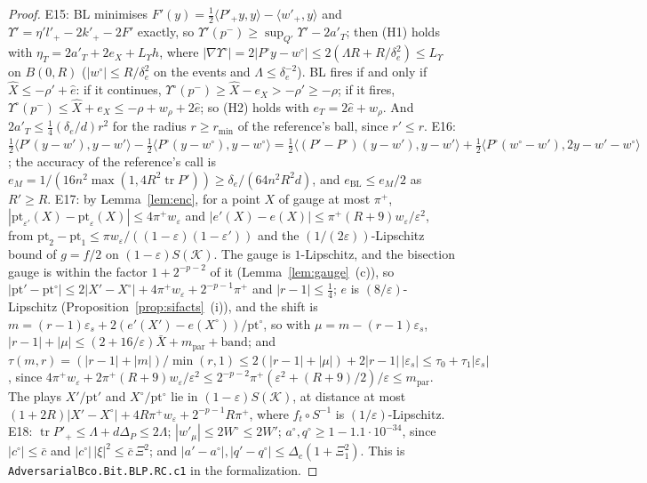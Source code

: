\documentclass[11pt]{amsart}
\theoremstyle{definition}
\numberwithin{equation}{section}
\newcommand{\cK}{\mathcal{K}}
\newcommand{\tr}{\operatorname{tr}}
\newcommand{\ip}[1]{\langle #1\rangle}
\begin{document}
\begin{proof}
E15: BL minimises $F'(y)=\frac12\ip{P'_+y,y}-\ip{w'_+,y}$ and $\Upsilon'=\eta'l'_+-2k'_+-2F'$ exactly, so $\Upsilon'(p^-)\ge\sup_{Q'}\Upsilon'-2a'_T$; then (H1) holds with $\eta_T=2a'_T+2e_X+L_\Upsilon h$, where $|\nabla\Upsilon^\circ|=2|P^\circ y-w^\circ|\le2(\Lambda R+R/\delta_e^2)\le L_\Upsilon$ on $B(0,R)$ ($|w^\circ|\le R/\delta_e^2$ on the events and $\Lambda\le\delta_e^{-2}$). BL fires if and only if $\hat X\le-\rho'+\hat e$: if it continues, $\Upsilon^\circ(p^-)\ge\hat X-e_X>-\rho'\ge-\rho$; if it fires, $\Upsilon^\circ(p^-)\le\hat X+e_X\le-\rho+w_\rho+2\hat e$; so (H2) holds with $e_T=2\hat e+w_\rho$. And $2a'_T\le\frac14(\delta_e/d)r^2$ for the radius $r\ge r_{\min}$ of the reference's ball, since $r'\le r$.
E16: $\frac12\ip{P'(y-w'),y-w'}-\frac12\ip{P^\circ(y-w^\circ),y-w^\circ}=\frac12\ip{(P'-P^\circ)(y-w'),y-w'}+\frac12\ip{P^\circ(w^\circ-w'),2y-w'-w^\circ}$; the accuracy of the reference's call is $e_M=1/(16n^2\max(1,4R^2\tr P'))\ge\delta_e/(64n^2R^2d)$, and $e_{\mathrm{BL}}\le e_M/2$ as $R'\ge R$.
E17: by Lemma~\ref{lem:enc}, for a point $X$ of gauge at most $\pi^+$, $|\mathrm{pt}_{\varepsilon'}(X)-\mathrm{pt}_\varepsilon(X)|\le4\pi^+w_\varepsilon$ and $|e'(X)-e(X)|\le\pi^+(R+9)w_\varepsilon/\varepsilon^2$, from $\mathrm{pt}_2-\mathrm{pt}_1\le\pi w_\varepsilon/((1-\varepsilon)(1-\varepsilon'))$ and the $(1/(2\varepsilon))$-Lipschitz bound of $g=f/2$ on $(1-\varepsilon)S(\cK)$. The gauge is $1$-Lipschitz, and the bisection gauge is within the factor $1+2^{-p-2}$ of it (Lemma~\ref{lem:gauge}~(c)), so $|\mathrm{pt}'-\mathrm{pt}^\circ|\le2|X'-X^\circ|+4\pi^+w_\varepsilon+2^{-p-1}\pi^+$ and $|r-1|\le\frac14$; $e$ is $(8/\varepsilon)$-Lipschitz (Proposition~\ref{prop:sifacts}~(i)), and the shift is $m=(r-1)\varepsilon_s+2(e'(X')-e(X^\circ))/\mathrm{pt}^\circ$, so with $\mu=m-(r-1)\varepsilon_s$, $|r-1|+|\mu|\le(2+16/\varepsilon)\bar X+m_{\mathrm{par}}+\mathrm{band}$; and $\tau(m,r)=(|r-1|+|m|)/\min(r,1)\le2(|r-1|+|\mu|)+2|r-1|\,|\varepsilon_s|\le\tau_0+\tau_1|\varepsilon_s|$, since $4\pi^+w_\varepsilon+2\pi^+(R+9)w_\varepsilon/\varepsilon^2\le2^{-p-2}\pi^+(\varepsilon^2+(R+9)/2)/\varepsilon\le m_{\mathrm{par}}$. The plays $X'/\mathrm{pt}'$ and $X^\circ/\mathrm{pt}^\circ$ lie in $(1-\varepsilon)S(\cK)$, at distance at most $(1+2R)|X'-X^\circ|+4R\pi^+w_\varepsilon+2^{-p-1}R\pi^+$, where $f_t\circ S^{-1}$ is $(1/\varepsilon)$-Lipschitz.
E18: $\tr P'_+\le\Lambda+d\Delta_P\le2\Lambda$; $|w'_\mu|\le2W^\circ\le2W'$; $a^\circ,q^\circ\ge1-1.1\cdot10^{-34}$, since $|c^\circ|\le\bar c$ and $|c^\circ|\,|\xi|^2\le\bar c\,\Xi^2$; and $|a'-a^\circ|,|q'-q^\circ|\le\Delta_c(1+\Xi_1^2)$.
This is \texttt{AdversarialBco.Bit.BLP.RC.c1} in the formalization.
\end{proof}
\end{document}
